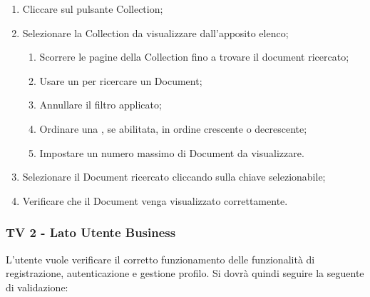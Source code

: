 \begin{enumerate}
\item Cliccare sul pulsante Collection;
\item Selezionare la Collection da visualizzare dall'apposito elenco;
\begin{enumerate}
\item Scorrere le pagine della Collection fino a trovare il document ricercato;
\item Usare un  per ricercare un Document;
\item Annullare il filtro applicato;
\item Ordinare una , se abilitata, in ordine crescente o decrescente;
\item Impostare un numero massimo di Document da visualizzare.
\end{enumerate}
\item Selezionare il Document ricercato cliccando sulla chiave selezionabile;
\item Verificare che il Document venga visualizzato correttamente.
\end{enumerate}

\subsubsection{TV 2 - Lato Utente Business}
L’utente vuole verificare il corretto funzionamento delle funzionalità di registrazione, autenticazione e gestione profilo.
Si dovrà quindi seguire la seguente  di validazione:

